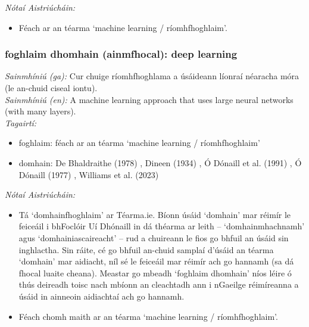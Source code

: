  \noindent \textit{Nótaí Aistriúcháin:}
\begin{itemize}
	\item Féach ar an téarma `machine learning / ríomhfhoghlaim'.
\end{itemize}


\subsubsection*{foghlaim dhomhain (ainmfhocal): deep learning}
 \noindent \textit{Sainmhíniú (ga):} Cur chuige ríomhfhoghlama a úsáideann líonraí néaracha móra (le an-chuid ciseal iontu).
\\
 \noindent \textit{Sainmhíniú (en):} A machine learning approach that uses large neural networks (with many layers).
\\
 \noindent \textit{Tagairtí:}
\begin{itemize}
	\item foghlaim: féach ar an téarma `machine learning / ríomhfhoghlaim'
	\item domhain: De Bhaldraithe (1978) \cite{de-bhaldraithe}, Dineen (1934) \cite{dineen}, Ó Dónaill et al. (1991) \cite{focloir-beag}, Ó Dónaill (1977) \cite{odonaill}, Williams et al. (2023) \cite{storchiste}
\end{itemize}

 \noindent \textit{Nótaí Aistriúcháin:}
\begin{itemize}
	\item Tá `domhainfhoghlaim' ar Téarma.ie. Bíonn úsáid `domhain' mar réimír le feiceáil i bhFoclóir Uí Dhónaill in dá théarma ar leith -- `domhainmhachnamh' agus `domhainiascaireacht' -- rud a chuireann le fios go bhfuil an úsáid sin inghlactha. Sin ráite, cé go bhfuil an-chuid samplaí d'úsáid an téarma `domhain' mar aidiacht, níl sé le feiceáil mar réimír ach go hannamh (sa dá fhocal luaite cheana). Meastar go mbeadh `foghlaim dhomhain' níos léire ó thús deireadh toisc nach mbíonn an cleachtadh ann i nGaeilge réimíreanna a úsáid in ainneoin aidiachtaí ach go hannamh.
	\item Féach chomh maith ar an téarma `machine learning / ríomhfhoghlaim'.
\end{itemize}


